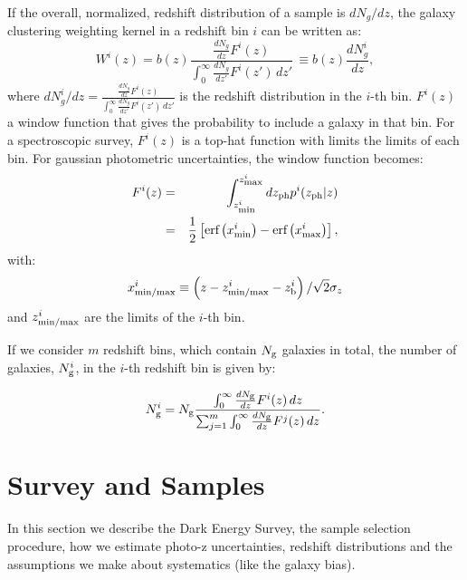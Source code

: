 \documentclass[a4paper,fleqn,usenatbib]{mnras}
\begin{document}
If the overall, normalized, redshift distribution of a sample is $dN_g/dz$, the galaxy clustering weighting kernel in a redshift bin $i$ can be written as:
\begin{equation}
\label{eq: W_i}
W^i(z) =b(z) \frac{\frac{dN_g}{dz}F^i(z)}{\int_0^\infty \frac{dN_g}{dz'}F^i(z') \,dz'} \, \equiv b(z) \frac{dN_g^i}{dz},
\end{equation}
where $dN_g^i/dz = \frac{\frac{dN_g}{dz}F^i(z)}{\int_0^\infty \frac{dN_g}{dz'}F^i(z') \,dz'} $ is the redshift distribution in the $i$-th bin.
$F^i(z)$ a window function that gives the probability to include a galaxy in that bin.
For a spectroscopic survey, $F^i(z)$ is a top-hat function with limits the limits of each bin. For gaussian photometric uncertainties, the window function becomes:
\begin{eqnarray}
\label{eq: F_i}
F^i(z)&=&\int_{z^i_{\mbox{\scriptsize{min}}}}^{z^i_{\mbox{\scriptsize{max}}}} dz_{\mbox{\scriptsize{ph}}} p^i(z_{\mbox{\scriptsize{ph}}}|z)  \\
&=&\frac{1}{2}\left[\mbox{erf}\left(x^i_{\mbox{\scriptsize{min}}}\right) - \mbox{erf}\left(x^i_{\mbox{\scriptsize{max}}}\right)\right] ,
\end{eqnarray}
with:
\begin{equation}
x^i_{\mbox{\scriptsize{min/max}}} \equiv \left(z - z^i_{\mbox{\scriptsize{min/max}}} -  z^i_{\mbox{\scriptsize{b}}} \right)/\sqrt{2}\sigma_z
\end{equation}
and
$z^i_{\mbox{\scriptsize{min/max}}}$ are the limits of the  $i$-th bin.

If we consider $m$ redshift bins, which  contain $N_{\mbox{\scriptsize{g}}}$ galaxies in total, the number of galaxies, $N_{\mbox{\scriptsize{g}}}^i$, in the $i$-th redshift bin is given by:

\begin{equation}
\label{eq: gal_in_bin}
N_{\mbox{\scriptsize{g}}}^i = N_{\mbox{\scriptsize{g}}} \frac{\int_0^\infty \frac{dN_{\mbox{\scriptsize{g}}} }{dz}F^i(z) \,dz}{{\sum_{j=1}^m} \int_0^\infty \frac{dN_{\mbox{\scriptsize{g}}} }{dz}F^j(z) \,dz}.
\end{equation}



\section{Survey and Samples}
\label{sec: survey_samples}

In this section we describe the Dark Energy Survey, the sample selection procedure, how we estimate photo-z uncertainties, redshift distributions and the assumptions we make about systematics (like the galaxy bias).
\end{document}
